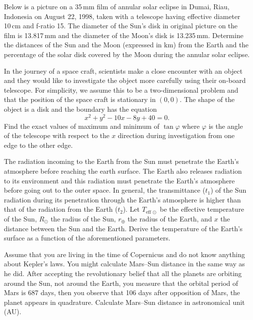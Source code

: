 Below is a picture on a 35\,mm film of annular solar eclipse in Dumai, Riau,
Indonesia on August 22, 1998, taken with a telescope having effective diameter
10\,cm and f-ratio 15. The diameter of the Sun's disk in original picture on
the film is 13.817\,mm and the diameter of the Moon's disk is 13.235\,mm.
Determine the distances of the Sun and the Moon (expressed in km) from the
Earth and the percentage of the solar disk covered by the Moon during the
annular solar eclipse.

In the journey of a space craft, scientists make a close encounter with an
object and they would like to investigate the object more carefully using their
on-board telescope. For simplicity, we assume this to be a two-dimensional
problem and that the position of the space craft is stationary in $(0,0)$. The
shape of the object is a disk and the boundary has the equation
\[ x^2 + y^2 - 10x - 8y + 40 = 0. \]
Find the exact values of maximum and minimum of $\tan\varphi$ where $\varphi$
is the angle of the telescope with respect to the $x$ direction during
investigation from one edge to the other edge.

The radiation incoming to the Earth from the Sun must penetrate the Earth's
atmosphere before reaching the earth surface. The Earth also releases radiation
to its environment and this radiation must penetrate the Earth's atmosphere
before going out to the outer space. In general, the transmittance ($t_1$) of
the Sun radiation during its penetration through the Earth's atmosphere is
higher than that of the radiation from the Earth ($t_2$). Let
$T_{\mathrm{eff}\,\odot}$ be the effective temperature of the Sun, $R_\odot$
the radius of the Sun, $r_\oplus$ the radius of the Earth, and $x$ the distance
between the Sun and the Earth. Derive the temperature of the Earth's surface as
a function of the aforementioned parameters.

Assume that you are living in the time of Copernicus and do not know anything
about Kepler's laws. You might calculate Mars--Sun distance in the same way as
he did. After accepting the revolutionary belief that all the planets are
orbiting around the Sun, not around the Earth, you measure that the orbital
period of Mars is 687 days, then you observe that 106 days after opposition of
Mars, the planet appears in quadrature. Calculate Mars--Sun distance in
astronomical unit (AU).

